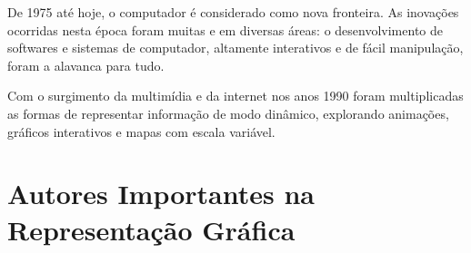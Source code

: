 \inic De 1975 até hoje, o computador é considerado como nova fronteira. As inovações ocorridas nesta época foram muitas e em diversas áreas: o desenvolvimento de softwares e sistemas de computador,
altamente interativos e de fácil manipulação, foram a alavanca para tudo.\vskip0.3cm  


\inic Com o surgimento da multimídia e da internet nos anos
1990 foram multiplicadas as formas de representar informação de modo dinâmico,
explorando animações, gráficos interativos e mapas com escala variável.






\newpage
\section{Autores Importantes na Representação Gráfica}

